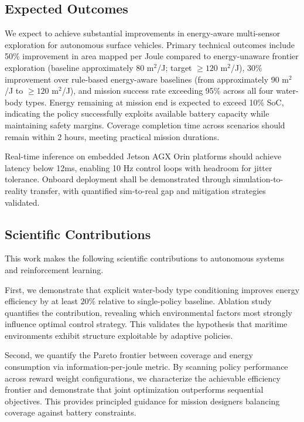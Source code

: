 \subsection{Expected Outcomes}

We expect to achieve substantial improvements in energy-aware multi-sensor exploration for autonomous surface vehicles. Primary technical outcomes include 50\% improvement in area mapped per Joule compared to energy-unaware frontier exploration (baseline approximately 80 m$^2$/J; target $\geq 120$ m$^2$/J), 30\% improvement over rule-based energy-aware baselines (from approximately 90 m$^2$/J to $\geq 120$ m$^2$/J), and mission success rate exceeding 95\% across all four water-body types. Energy remaining at mission end is expected to exceed 10\% SoC, indicating the policy successfully exploits available battery capacity while maintaining safety margins. Coverage completion time across scenarios should remain within 2 hours, meeting practical mission durations.

Real-time inference on embedded Jetson AGX Orin platforms should achieve latency below 12ms, enabling 10 Hz control loops with headroom for jitter tolerance. Onboard deployment shall be demonstrated through simulation-to-reality transfer, with quantified sim-to-real gap and mitigation strategies validated.

\subsection{Scientific Contributions}

This work makes the following scientific contributions to autonomous systems and reinforcement learning.

First, we demonstrate that explicit water-body type conditioning improves energy efficiency by at least 20\% relative to single-policy baseline. Ablation study quantifies the contribution, revealing which environmental factors most strongly influence optimal control strategy. This validates the hypothesis that maritime environments exhibit structure exploitable by adaptive policies.

Second, we quantify the Pareto frontier between coverage and energy consumption via information-per-joule metric. By scanning policy performance across reward weight configurations, we characterize the achievable efficiency frontier and demonstrate that joint optimization outperforms sequential objectives. This provides principled guidance for mission designers balancing coverage against battery constraints.

